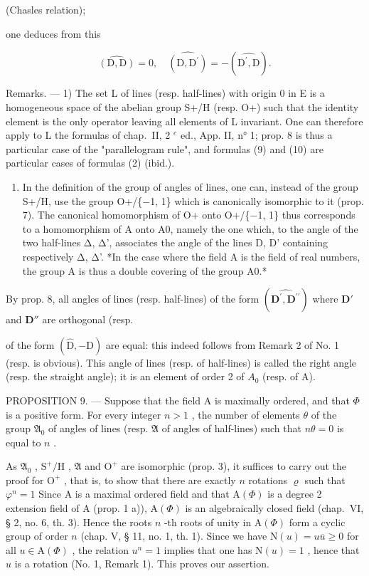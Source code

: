 (Chasles relation);

one deduces from this

\[
\widehat {(\mathrm{D} , \mathrm{D})} = 0, \quad \widehat {(\mathrm{D} , \mathrm{D} ^ {\prime})} = - (\widehat {\mathrm{D} ^ {\prime} , \mathrm{D}}).\tag{10}
\]

Remarks. --- 1) The set L of lines (resp. half-lines) with origin 0 in E is a homogeneous space of the abelian group S+/H (resp. O+) such that the identity element is the only operator leaving all elements of L invariant. One can therefore apply to L the formulas of chap.~II, 2 \(^{e}\) ed., App. II, n° 1; prop. 8 is thus a particular case of the "parallelogram rule", and formulas (9) and (10) are particular cases of formulas (2) (ibid.).

\begin{enumerate}
\def\labelenumi{\arabic{enumi})}
\setcounter{enumi}{1}
\tightlist
\item
  In the definition of the group of angles of lines, one can, instead of the group S+/H, use the group O+/\{−1, 1\} which is canonically isomorphic to it (prop. 7). The canonical homomorphism of O+ onto O+/\{−1, 1\} thus corresponds to a homomorphism of A onto A0, namely the one which, to the angle of the two half-lines Δ, Δ', associates the angle of the lines D, D' containing respectively Δ, Δ'. *In the case where the field A is the field of real numbers, the group A is thus a double covering of the group A0.*
\end{enumerate}

By prop. 8, all angles of lines (resp. half-lines) of the form \((\widehat{\mathbf{D}^{\prime},\mathbf{D}^{\prime\prime}})\) where \(\mathbf{D}'\) and \(\mathbf{D}''\) are orthogonal (resp.

of the form \((\widehat{\mathrm{D}}, -\mathrm{D})\) are equal: this indeed follows from Remark 2 of No. 1 (resp. is obvious). This angle of lines (resp. of half-lines) is called the right angle (resp. the straight angle); it is an element of order 2 of \(A_{0}\) (resp. of A).

PROPOSITION 9. --- Suppose that the field A is maximally ordered, and that \(\Phi\) is a positive form. For every integer \(n>1\) , the number of elements \(\theta\) of the group \(\mathfrak{A}_{0}\) of angles of lines (resp. \(\mathfrak{A}\) of angles of half-lines) such that \(n\theta=0\) is equal to \(n\) .

As \(\mathfrak{A}_{0}\) , \(\mathrm{S}^{+}/\mathrm{H}\) , \(\mathfrak{A}\) and \(\mathrm{O}^{+}\) are isomorphic (prop. 3), it suffices to carry out the proof for \(\mathrm{O}^{+}\) , that is, to show that there are exactly \(n\) rotations \(\varrho\) such that \(\varphi^{n}=1\) Since A is a maximal ordered field and that \(\mathrm{A}(\Phi)\) is a degree 2 extension field of A (prop. 1 a)), \(\mathrm{A}(\Phi)\) is an algebraically closed field (chap.~VI, § 2, no. 6, th. 3). Hence the roots \(n\) -th roots of unity in \(\mathrm{A}(\Phi)\) form a cyclic group of order \(n\) (chap. V, § 11, no. 1, th. 1). Since we have \(\mathrm{N}(u)=u\overline{u}\geqslant0\) for all \(u\in\mathrm{A}(\Phi)\) , the relation \(u^{n}=1\) implies that one has \(\mathrm{N}(u)=1\) , hence that \(u\) is a rotation (No. 1, Remark 1). This proves our assertion.


